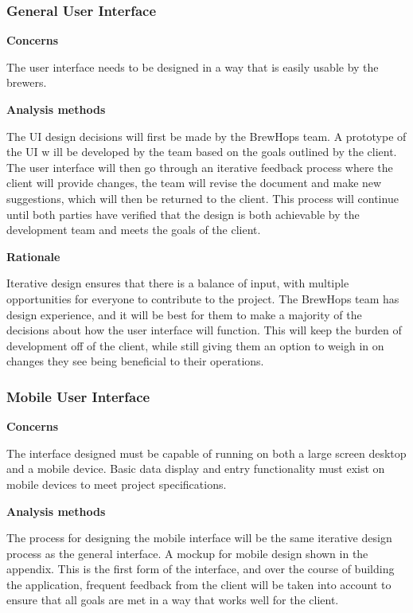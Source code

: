 \documentclass[draftclsnofoot,onecolumn,letterpaper,10pt]{IEEEtran}
\begin{document}
		\subsubsection{General User Interface}
			\textbf{Concerns}

			The user interface needs to be designed in a way that is easily usable by the brewers.

			\textbf{Analysis methods}

			The UI design decisions will first be made by the BrewHops team.
			A prototype of the UI w ill be developed by the team based on the goals outlined by the client.
			The user interface will then go through an iterative feedback process where the client will provide changes, the team will revise the document and make new suggestions, which will then be returned to the client.
			This process will continue until both parties have verified that the design is both achievable by the development team and meets the goals of the client.

			\textbf{Rationale}

			Iterative design ensures that there is a balance of input, with multiple opportunities for everyone to contribute to the project.
			The BrewHops team has design experience, and it will be best for them to make a majority of the decisions about how the user interface will function.
			This will keep the burden of development off of the client, while still giving them an option to weigh in on changes they see being beneficial to their operations.

			\subsubsection{Mobile User Interface}
				\textbf{Concerns}

				The interface designed must be capable of running on both a large screen desktop and a mobile device.
				Basic data display and entry functionality must exist on mobile devices to meet project specifications.

				\textbf{Analysis methods}

				The process for designing the mobile interface will be the same iterative design process as the general interface.
				A mockup for mobile design shown in the appendix.
				This is the first form of the interface, and over the course of building the application, frequent feedback from the client will be taken into account to ensure that all goals are met in a way that works well for the client.
\end{document}
